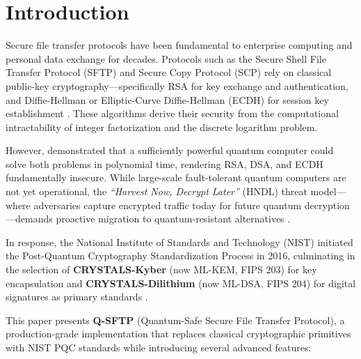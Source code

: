 \documentclass[12pt, a4paper]{article}
\begin{document}
\newpage
\tableofcontents
\newpage

\section{Introduction}

Secure file transfer protocols have been fundamental to enterprise computing and personal data exchange for decades. Protocols such as the Secure Shell File Transfer Protocol (SFTP) and Secure Copy Protocol (SCP) rely on classical public-key cryptography—specifically RSA for key exchange and authentication, and Diffie-Hellman or Elliptic-Curve Diffie-Hellman (ECDH) for session key establishment \parencite{ylonen2006secure}. These algorithms derive their security from the computational intractability of integer factorization and the discrete logarithm problem.

However, \textcite{shor1994algorithms} demonstrated that a sufficiently powerful quantum computer could solve both problems in polynomial time, rendering RSA, DSA, and ECDH fundamentally insecure. While large-scale fault-tolerant quantum computers are not yet operational, the \textit{``Harvest Now, Decrypt Later''} (HNDL) threat model—where adversaries capture encrypted traffic today for future quantum decryption—demands proactive migration to quantum-resistant alternatives \parencite{mosca2018cybersecurity}.

In response, the National Institute of Standards and Technology (NIST) initiated the Post-Quantum Cryptography Standardization Process in 2016, culminating in the selection of \textbf{CRYSTALS-Kyber} (now ML-KEM, FIPS 203) for key encapsulation and \textbf{CRYSTALS-Dilithium} (now ML-DSA, FIPS 204) for digital signatures as primary standards \parencite{nist2024standards}.

This paper presents \textbf{Q-SFTP} (Quantum-Safe Secure File Transfer Protocol), a production-grade implementation that replaces classical cryptographic primitives with NIST PQC standards while introducing several advanced features:
\end{document}
